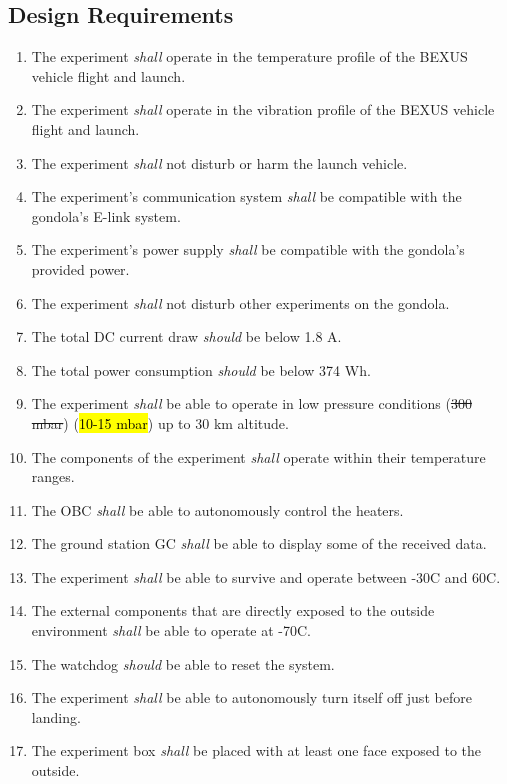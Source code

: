 \subsection{Design Requirements}

\begin{enumerate}[label=D.\arabic*]
    \item The experiment \textit{shall} operate in the temperature profile of the BEXUS vehicle flight and launch.
    \item The experiment \textit{shall} operate in the vibration profile of the BEXUS vehicle flight and launch.
    \item The experiment \textit{shall} not disturb or harm the launch vehicle.
    \item The experiment's communication system \textit{shall} be compatible with the gondola's E-link system.
    \item The experiment's power supply \textit{shall} be compatible with the gondola's provided power.
    \item The experiment \textit{shall} not disturb other experiments on the gondola.
    \item The total DC current draw \textit{should} be below 1.8 A.
    \item The total power consumption \textit{should} be below 374 Wh.
    \item The experiment \textit{shall} be able to operate in low pressure conditions (\st{300 mbar}) (\hl{10-15 mbar}) up to 30 km altitude.
    \item The components of the experiment \textit{shall} operate within their temperature ranges.
    \item The OBC \textit{shall} be able to autonomously control the heaters.
    \item The ground station GC \textit{shall} be able to display some of the received data.
    \item The experiment \textit{shall} be able to survive and operate between -30\degree C and 60\degree C.
    \item The external components that are directly exposed to the outside environment \textit{shall} be able to operate at -70\degree C.
    \item The watchdog \textit{should} be able to reset the system.
    \item The experiment \textit{shall} be able to autonomously turn itself off just before landing.
    \item The experiment box \textit{shall} be placed with at least one face exposed to the outside. 
\end{enumerate}